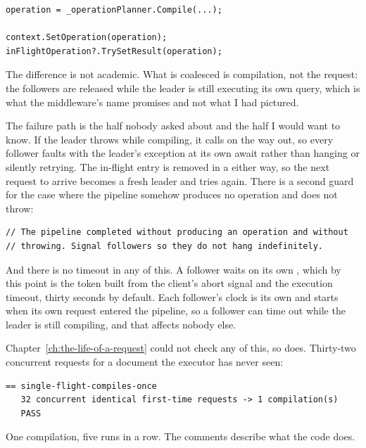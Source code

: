 \begin{verbatim}
operation = _operationPlanner.Compile(...);

context.SetOperation(operation);
inFlightOperation?.TrySetResult(operation);
\end{verbatim}

The difference is not academic. What is coalesced is compilation, not the
request: the followers are released while the leader is still executing its own
query, which is what the middleware's name promises and not what I had pictured.

%
The failure path is the half nobody asked about and the half I would want to
know. If the leader throws while compiling, it calls  on
the way out, so every follower faults with the leader's exception at its own
await rather than hanging or silently retrying. The in-flight entry is removed
in a  either way, so the next request to arrive becomes a fresh
leader and tries again. There is a second guard for the case where the pipeline
somehow produces no operation and does not throw:

\begin{verbatim}
// The pipeline completed without producing an operation and without
// throwing. Signal followers so they do not hang indefinitely.
\end{verbatim}

And there is no timeout in any of this. A follower waits on its own
, which by this point is the token
 built from the client's abort signal and the execution
timeout, thirty seconds by default. Each follower's clock is its own and starts
when its own request entered the pipeline, so a follower can time out while the
leader is still compiling, and that affects nobody else.

%
Chapter~\ref{ch:the-life-of-a-request} could not check any of this, so
 does. Thirty-two concurrent requests for a
document the executor has never seen:

\begin{verbatim}
== single-flight-compiles-once
   32 concurrent identical first-time requests -> 1 compilation(s)
   PASS
\end{verbatim}

One compilation, five runs in a row. The comments describe what the code does.

